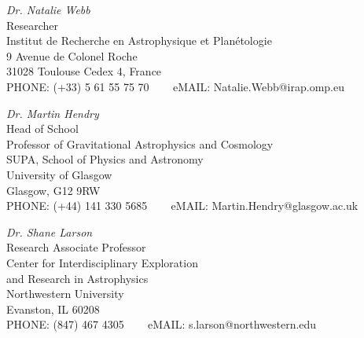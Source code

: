 \documentclass[letterpaper,10pt]{article}
\begin{document}
   \begin{tabbing}
 \emph{Dr. Natalie Webb}\\
Researcher\\
Institut de Recherche en Astrophysique et Planétologie \\
9 Avenue de Colonel Roche \\
31028 Toulouse Cedex 4, France\\ 
PHONE:  (+33) 5 61 55 75 70  \,\,\,\,\,\,\,\,\, eMAIL: Natalie.Webb@irap.omp.eu
\end{tabbing}


\begin{tabbing}
 \emph{Dr. Martin Hendry}\\
Head of School\\
Professor of Gravitational Astrophysics and Cosmology \\
SUPA, School of Physics and Astronomy \\
University of Glasgow  \\
Glasgow, G12 9RW \\ 
PHONE:  (+44) 141 330 5685   \,\,\,\,\,\,\,\,\, eMAIL: Martin.Hendry@glasgow.ac.uk
\end{tabbing}


   \begin{tabbing}
 \emph{Dr. Shane Larson}\\
Research Associate Professor \\
Center for Interdisciplinary Exploration \\
and Research in Astrophysics \\
Northwestern University \\
Evanston, IL 60208  \\ 
PHONE:  (847) 467 4305   \,\,\,\,\,\,\,\,\, eMAIL: s.larson@northwestern.edu
\end{tabbing}







\end{document}
